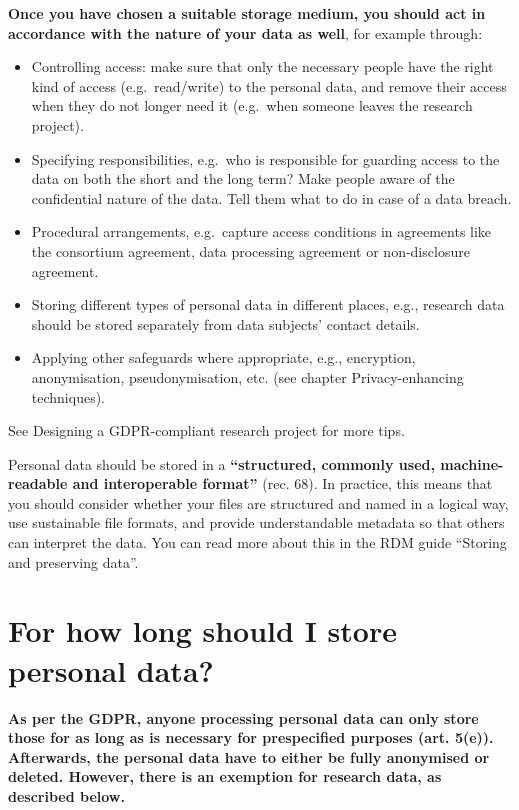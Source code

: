 \documentclass[
]{book}
\providecommand{\tightlist}{%
  \setlength{\itemsep}{0pt}\setlength{\parskip}{0pt}}
\begin{document}
\textbf{Once you have chosen a suitable storage medium, you should act in accordance
with the nature of your data as well}, for example through:

\begin{itemize}
\tightlist
\item
  Controlling access: make sure that only the necessary people have the right
  kind of access (e.g.~read/write) to the personal data, and remove their access
  when they do not longer need it (e.g.~when someone leaves the research project).\\
\item
  Specifying responsibilities, e.g.~who is responsible for guarding access to the
  data on both the short and the long term? Make people aware of the confidential
  nature of the data. Tell them what to do in case of a
  data breach.
\item
  Procedural arrangements, e.g.~capture access conditions in
  agreements like the consortium agreement,
  data processing agreement or non-disclosure agreement.
\item
  Storing different types of personal data in different places, e.g., research
  data should be stored separately from data subjects' contact details.
\item
  Applying other safeguards where appropriate, e.g., encryption, anonymisation,
  pseudonymisation, etc. (see chapter Privacy-enhancing
  techniques).
\end{itemize}

See Designing a GDPR-compliant research project for more tips.

Personal data should be stored in a \textbf{``structured, commonly used, machine-readable
and interoperable format''} (rec. 68).
In practice, this means that you should consider whether your files are
structured and named in a logical way, use
sustainable file formats,
and provide understandable metadata so that others can interpret the data.
You can read more about this in the RDM guide
``Storing and preserving data''.

\hypertarget{data-storage-duration}{%
\section{For how long should I store personal data?}\label{data-storage-duration}}

\textbf{As per the GDPR, anyone processing personal data can only store those for as
long as is necessary for prespecified purposes
(art. 5(e)).
Afterwards, the personal data have to either be fully anonymised or deleted.
However, there is an exemption for research data, as described below.}
\end{document}
